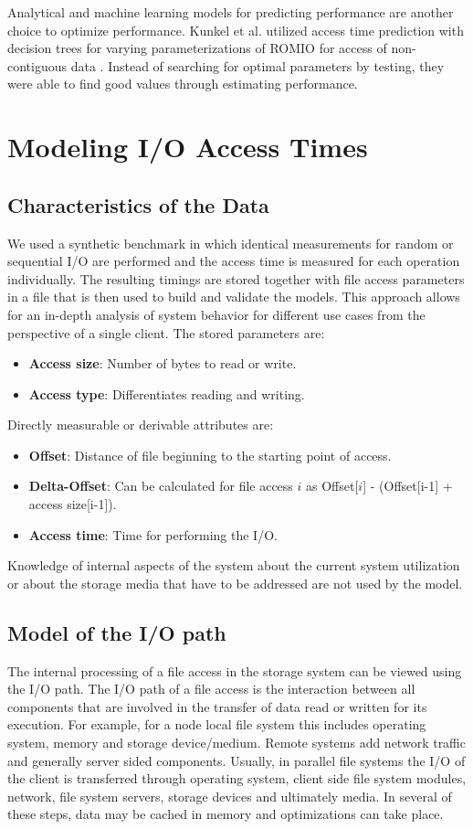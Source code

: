 \documentclass{superfri}
\begin{document}
	Analytical and machine learning models for predicting performance are another choice to optimize performance.
	Kunkel et al. utilized access time prediction with decision trees for varying parameterizations of ROMIO for access of non-contiguous data \cite{UMLTPTPONI15}. 
	Instead of searching for optimal parameters by testing, they were able to find good values through estimating performance.
	
	
	\section{Modeling I/O Access Times}
	\label{modeling_access_times}
	\subsection{Characteristics of the Data}
	We used a synthetic benchmark in which identical measurements for random or sequential I/O are performed and the access time is measured for each operation individually.
	The resulting timings are stored together with file access parameters in a file that is then used to build and validate the models.
	This approach allows for an in-depth analysis of system behavior for different use cases from the perspective of a single client.
	The stored parameters are:
	\begin{itemize}
		\item \textbf{Access size}: Number of bytes to read or write.
		\item \textbf{Access type}: Differentiates reading and writing.
	\end{itemize}
	Directly measurable or derivable attributes are:
	\begin{itemize}
		\item \textbf{Offset}: Distance of file beginning to the starting point of access.
		\item \textbf{Delta-Offset}: Can be calculated for file access $i$ as Offset[$i$] - (Offset[i-1] + access size[i-1]).
		\item \textbf{Access time}: Time for performing the I/O.
	\end{itemize}
	Knowledge of internal aspects of the system about the current system utilization or about the storage media that have to be addressed are not used by the model.
	
	\subsection{Model of the I/O path}
	The internal processing of a file access in the storage system can be viewed using the I/O path.	
	The I/O path of a file access is the interaction between all components that are involved in the transfer of data read or written for its execution.
	For example, for a node local file system this includes operating system, memory and storage device/medium. Remote systems add network	traffic and generally server sided components.
	Usually, in parallel file systems the I/O of the client is transferred through operating system, client side file system modules, network, file system servers, storage devices and ultimately media.
	In several of these steps, data may be cached in memory and optimizations can take place.
		
\end{document}
